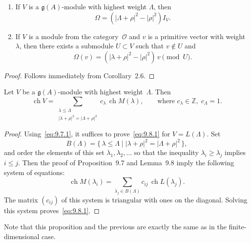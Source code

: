 \documentclass[12pt]{article}
\begin{document}
\begin{lemma}[9.8]
\leavevmode
\begin{enumerate}[label=\textup{(\alph*)}]
\item
If $V$ is a $\mathfrak{g}(A)$-module with highest weight $\Lambda$, then
\[
\Omega = (|\Lambda + \rho|^2 - |\rho|^2) I_V.
\]

\item
If $V$ is a module from the category~$\mathcal{O}$ and $v$ is a primitive vector with weight~$\lambda$, 
then there exists a submodule $U \subset V$ such that $v \notin U$ and
\[
\Omega(v) = (|\lambda + \rho|^2 - |\rho|^2)\, v \pmod{U}.
\]
\end{enumerate}

\begin{proof}
Follows immediately from Corollary~2.6.
\end{proof}
\end{lemma}

\begin{proposition}[9.8]
Let $V$ be a $\mathfrak{g}(A)$-module with highest weight~$\Lambda$. Then
\begin{equation}\label{eq:9.8.1}
\operatorname{ch} V
= \sum_{\substack{\lambda \le \Lambda \\ |\lambda + \rho|^2 = |\Lambda + \rho|^2}}
c_\lambda \, \operatorname{ch} M(\lambda),
\qquad
\text{where } c_\lambda \in \mathbb{Z}, \; c_\Lambda = 1.
\end{equation}
\end{proposition}

\begin{proof}
Using~\eqref{eq:9.7.1}, it suffices to prove~\eqref{eq:9.8.1} for $V = L(\Lambda)$.
Set
\[
B(\Lambda)
= \{\, \lambda \le \Lambda \mid |\lambda + \rho|^2 = |\Lambda + \rho|^2 \,\},
\]
and order the elements of this set $\lambda_1, \lambda_2, \dots$
so that the inequality $\lambda_i \ge \lambda_j$ implies $i \le j$.
Then the proof of Proposition~9.7 and Lemma~9.8 imply the following
system of equations:
\[
\operatorname{ch} M(\lambda_i)
= \sum_{\lambda_j \in B(\Lambda)} c_{ij}\, \operatorname{ch} L(\lambda_j).
\]
The matrix $(c_{ij})$ of this system is triangular with ones on the diagonal.
Solving this system proves~\eqref{eq:9.8.1}.
\end{proof}
Note that this proposition and the previous are exactly the same as in the finite-dimensional case. 
\end{document}
